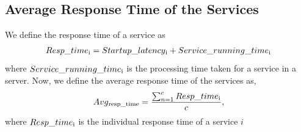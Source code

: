 \subsection{Average Response Time of the Services}
We define the response time of a service as
\begin{align*} Resp\_time\textsubscript{i} = Startup\_latency\textsubscript{i}+
 Service\_running\_time\textsubscript{i}\end{align*}
where \begin{math} Service\_running\_time\textsubscript{i}\end{math}
is the processing time taken
for a service in a server. Now, we define the average response
time of the services as,
\begin{align*} Avg\textsubscript{resp\_time} =\frac {\sum_{n=1}^{c} Resp\_time\textsubscript{i}} {c} ,\end{align*}
where \begin{math} Resp\_time\textsubscript{i}\end{math} is the individual response time of a service \begin{math} i \end{math}

